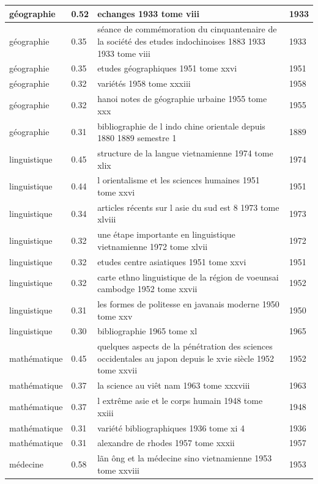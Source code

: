 \begin{longtable}{|p{3cm}|p{1cm}|p{10cm}|p{1cm}|}
géographie & 0.52 & echanges 1933 tome viii & 1933  \\ \hline
géographie & 0.35 & séance de commémoration du cinquantenaire de la société des etudes indochinoises 1883 1933 1933 tome viii & 1933  \\ \hline
géographie & 0.35 & etudes géographiques 1951 tome xxvi & 1951  \\ \hline
géographie & 0.32 & variétés 1958 tome xxxiii & 1958  \\ \hline
géographie & 0.32 & hanoi notes de géographie urbaine 1955 tome xxx & 1955  \\ \hline
géographie & 0.31 & bibliographie de l indo chine orientale depuis 1880 1889 semestre 1 & 1889  \\ \hline
linguistique & 0.45 & structure de la langue vietnamienne 1974 tome xlix & 1974  \\ \hline
linguistique & 0.44 & l orientalisme et les sciences humaines 1951 tome xxvi & 1951  \\ \hline
linguistique & 0.34 & articles récents sur l asie du sud est 8 1973 tome xlviii & 1973  \\ \hline
linguistique & 0.32 & une étape importante en linguistique vietnamienne 1972 tome xlvii & 1972  \\ \hline
linguistique & 0.32 & etudes centre asiatiques 1951 tome xxvi & 1951  \\ \hline
linguistique & 0.32 & carte ethno linguistique de la région de voeunsai cambodge 1952 tome xxvii & 1952  \\ \hline
linguistique & 0.31 & les formes de politesse en javanais moderne 1950 tome xxv & 1950  \\ \hline
linguistique & 0.30 & bibliographie 1965 tome xl & 1965  \\ \hline
mathématique & 0.45 & quelques aspects de la pénétration des sciences occidentales au japon depuis le xvie siècle 1952 tome xxvii & 1952  \\ \hline
mathématique & 0.37 & la science au viêt nam 1963 tome xxxviii & 1963  \\ \hline
mathématique & 0.37 & l extrême asie et le corps humain 1948 tome xxiii & 1948  \\ \hline
mathématique & 0.31 & variété bibliographiques 1936 tome xi 4 & 1936  \\ \hline
mathématique & 0.31 & alexandre de rhodes 1957 tome xxxii & 1957  \\ \hline
médecine & 0.58 & lãn ông et la médecine sino vietnamienne 1953 tome xxviii & 1953  \\ \hline

\end{longtable}
